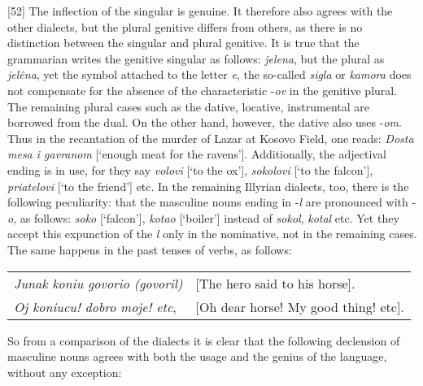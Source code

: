 [52] The inflection of the singular is genuine. It therefore also agrees with the other dialects, but the plural genitive differs from others, as there is no distinction between the singular and plural genitive. It is true that the grammarian writes the genitive singular as follows: \textit{jelena}, but the plural as \textit{jelêna}, yet the symbol attached to the letter \textit{e}, the so-called \textit{sigla} or \textit{kamora} does not compensate for the absence of the characteristic -\textit{ov} in the genitive plural. The remaining plural cases such as the dative, locative, instrumental are borrowed from the dual. On the other hand, however, the dative also uses -\textit{om}. Thus in the recantation of the murder of Lazar at Kosovo Field, one reads: \textit{Dosta mesa i gavranom} [‘enough meat for the ravens’]. Additionally, the adjectival ending is in use, for they say \textit{volovi} [‘to the ox’], \textit{sokolovi} [‘to the falcon’], \textit{priatelovi} [‘to the friend’] etc. In the remaining Illyrian dialects, too, there is the following peculiarity: that the masculine nouns ending in -\textit{l} are pronounced with -\textit{o}, as follows: \textit{soko} [‘falcon’], \textit{kotao} [‘boiler’] instead of \textit{sokol}, \textit{kotal} etc. Yet they accept this expunction of the \textit{l} only in the nominative, not in the remaining cases. The same happens in the past tenses of verbs, as follows:

\begin{longtable}{ l l }
    \textit{Junak koniu govorio (govoril)} & [The hero said to his horse]. \\
    \hspace*{5mm} \textit{Oj koniucu! dobro moje! etc}, & \hspace*{5mm} [Oh dear horse! My good thing! etc].
\end{longtable}

So from a comparison of the dialects it is clear that the following declension of masculine nouns agrees with both the usage and the genius of the language, without any exception:

